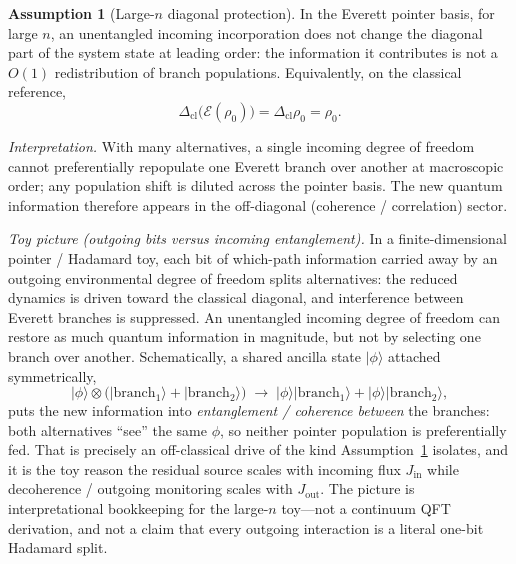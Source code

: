 \documentclass[11pt]{article}
\theoremstyle{definition}
\newtheorem{assumption}[theorem]{Assumption}
\theoremstyle{remark}
\begin{document}
\begin{assumption}[Large-$n$ diagonal protection]
\label{ass:large-n-diag}
In the Everett pointer basis, for large $n$, an unentangled incoming incorporation does not change the diagonal part of the system state at leading order: the information it contributes is not a $O(1)$ redistribution of branch populations.
Equivalently, on the classical reference,
\begin{equation}
  \Delta_{\mathrm{cl}}\bigl(\mathcal E(\rho_0)\bigr)=\Delta_{\mathrm{cl}}\rho_0=\rho_0.
  \label{eq:diag-protect}
\end{equation}
\end{assumption}

\noindent\textit{Interpretation.}
With many alternatives, a single incoming degree of freedom cannot preferentially repopulate one Everett branch over another at macroscopic order; any population shift is diluted across the pointer basis.
The new quantum information therefore appears in the off-diagonal (coherence / correlation) sector.

\noindent\textit{Toy picture (outgoing bits versus incoming entanglement).}
In a finite-dimensional pointer / Hadamard toy, each bit of which-path information carried away by an outgoing environmental degree of freedom splits alternatives: the reduced dynamics is driven toward the classical diagonal, and interference between Everett branches is suppressed.
An unentangled incoming degree of freedom can restore as much quantum information in magnitude, but not by selecting one branch over another.
Schematically, a shared ancilla state $\lvert\phi\rangle$ attached symmetrically,
\begin{equation}
  \lvert\phi\rangle\otimes\bigl(\lvert\mathrm{branch}_1\rangle+\lvert\mathrm{branch}_2\rangle\bigr)
  \;\longrightarrow\;
  \lvert\phi\rangle\lvert\mathrm{branch}_1\rangle+\lvert\phi\rangle\lvert\mathrm{branch}_2\rangle,
\end{equation}
puts the new information into \emph{entanglement / coherence between} the branches: both alternatives ``see'' the same $\phi$, so neither pointer population is preferentially fed.
That is precisely an off-classical drive of the kind Assumption~\ref{ass:large-n-diag} isolates, and it is the toy reason the residual source scales with incoming flux $J_{\mathrm{in}}$ while decoherence / outgoing monitoring scales with $J_{\mathrm{out}}$.
The picture is interpretational bookkeeping for the large-$n$ toy---not a continuum QFT derivation, and not a claim that every outgoing interaction is a literal one-bit Hadamard split.
\end{document}

